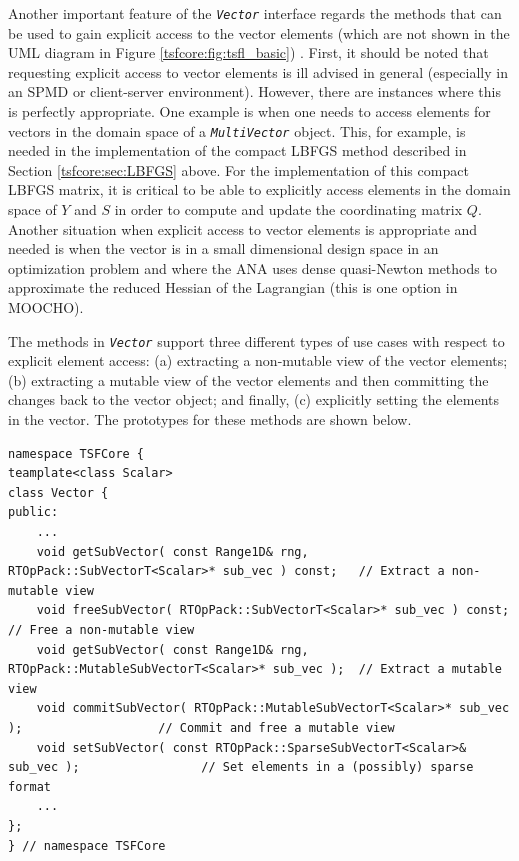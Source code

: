 \documentclass[10pt,fleqn]{article}
\begin{document}
Another important feature of the \texttt{\textit{Vector}} interface
regards the methods that can be used to gain explicit access to the
vector elements (which are not shown in the UML diagram in Figure
\ref{tsfcore:fig:tsfl_basic}) .  First, it should be noted that requesting
explicit access to vector elements is ill advised in general
(especially in an SPMD or client-server environment).  However, there
are instances where this is perfectly appropriate.  One example is
when one needs to access elements for vectors in the domain space of a
\texttt{\textit{MultiVector}} object.  This, for example, is needed in the
implementation of the compact LBFGS method described in Section
\ref{tsfcore:sec:LBFGS} above.  For the implementation of this compact
LBFGS matrix, it is critical to be able to explicitly access elements
in the domain space of $Y$ and $S$ in order to compute and update the
coordinating matrix $Q$.  Another situation when explicit access to
vector elements is appropriate and needed is when the vector is in a
small dimensional design space in an optimization problem and where
the ANA uses dense quasi-Newton methods to approximate the reduced
Hessian of the Lagrangian (this is one option in MOOCHO).

The methods in \texttt{\textit{Vector}} support three different types
of use cases with respect to explicit element access: (a) extracting a
non-mutable view of the vector elements; (b) extracting a mutable view
of the vector elements and then committing the changes back to the
vector object; and finally, (c) explicitly setting the elements in the
vector.  The prototypes for these methods are shown below.

{\scriptsize\begin{verbatim}
namespace TSFCore {
teamplate<class Scalar>
class Vector {
public:
    ...
    void getSubVector( const Range1D& rng, RTOpPack::SubVectorT<Scalar>* sub_vec ) const;   // Extract a non-mutable view
    void freeSubVector( RTOpPack::SubVectorT<Scalar>* sub_vec ) const;                      // Free a non-mutable view
    void getSubVector( const Range1D& rng, RTOpPack::MutableSubVectorT<Scalar>* sub_vec );  // Extract a mutable view
    void commitSubVector( RTOpPack::MutableSubVectorT<Scalar>* sub_vec );                   // Commit and free a mutable view
    void setSubVector( const RTOpPack::SparseSubVectorT<Scalar>& sub_vec );                 // Set elements in a (possibly) sparse format
    ...
};
} // namespace TSFCore
\end{verbatim}}
\end{document}
